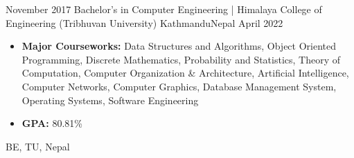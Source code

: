 \documentclass[localFont,alternative]{documentMETADATA}
\begin{document}
\begin{experiences}
	\experience
	{November 2017} {Bachelor's in Computer Engineering | Himalaya College of Engineering (Tribhuvan University) }{Kathmandu}{Nepal}
	{April 2022}    {\begin{itemize}
            \item \textbf{Major Courseworks:} Data Structures and Algorithms, Object Oriented Programming, Discrete Mathematics, Probability and Statistics, Theory of Computation, Computer Organization \& Architecture, Artificial Intelligence, Computer Networks, Computer Graphics, Database Management System, Operating Systems, Software Engineering
			\item \textbf{GPA: } 80.81\% 
	\end{itemize}}
	{{BE, TU, Nepal}}%
\end{experiences}
\renewcommand{\arraystretch}{1.5}
\end{document}
